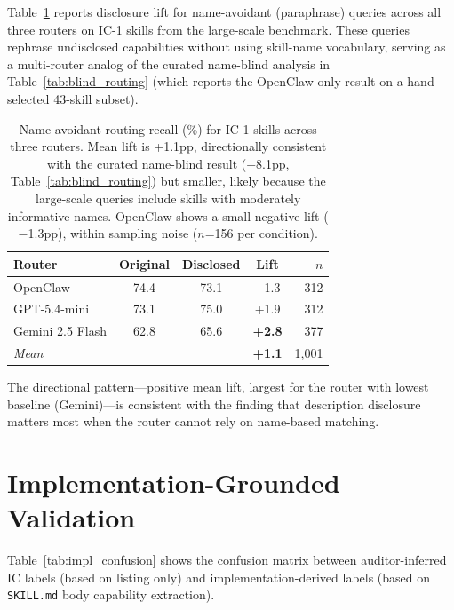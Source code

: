 \documentclass[11pt]{article}
\begin{document}
Table~\ref{tab:cross_router_blind} reports disclosure lift
for name-avoidant (paraphrase) queries across all three
routers on IC-1 skills from the large-scale benchmark.
These queries rephrase undisclosed capabilities without
using skill-name vocabulary, serving as a multi-router
analog of the curated name-blind analysis in
Table~\ref{tab:blind_routing} (which reports the
OpenClaw-only result on a hand-selected 43-skill subset).

\begin{table}[t]
\centering\small
\begin{tabular}{lcccr}
\toprule
\textbf{Router} & \textbf{Original} & \textbf{Disclosed} & \textbf{Lift} & \textbf{$n$} \\
\midrule
OpenClaw     & 74.4 & 73.1 & $-$1.3 & 312 \\
GPT-5.4-mini & 73.1 & 75.0 & +1.9   & 312 \\
Gemini 2.5 Flash & 62.8 & 65.6 & \textbf{+2.8} & 377 \\
\midrule
\emph{Mean}  &      &      & \textbf{+1.1} & 1{,}001 \\
\bottomrule
\end{tabular}
\caption{Name-avoidant routing recall (\%) for IC-1
skills across three routers.
Mean lift is +1.1pp, directionally consistent with the
curated name-blind result (+8.1pp, Table~\ref{tab:blind_routing})
but smaller, likely because the large-scale queries
include skills with moderately informative names.
OpenClaw shows a small negative lift ($-$1.3pp), within
sampling noise ($n$=156 per condition).}
\label{tab:cross_router_blind}
\end{table}

The directional pattern---positive mean lift,
largest for the router with lowest baseline
(Gemini)---is consistent with the finding that
description disclosure matters most when the router
cannot rely on name-based matching.

\section{Implementation-Grounded Validation}
\label{app:impl_validation}

Table~\ref{tab:impl_confusion} shows the confusion matrix
between auditor-inferred IC labels (based on listing only)
and implementation-derived labels (based on \texttt{SKILL.md}
body capability extraction).
\end{document}
